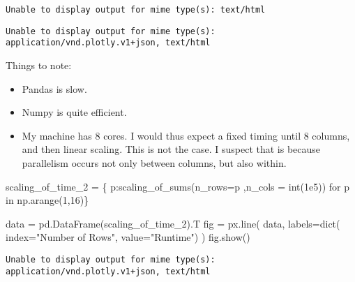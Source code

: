 \documentclass[
  letterpaper,
  DIV=11,
  numbers=noendperiod]{scrartcl}
\newenvironment{Shaded}{\begin{snugshade}}{\end{snugshade}}
\newcommand{\BuiltInTok}[1]{\textcolor[rgb]{0.00,0.23,0.31}{#1}}
\newcommand{\ControlFlowTok}[1]{\textcolor[rgb]{0.00,0.23,0.31}{#1}}
\newcommand{\DecValTok}[1]{\textcolor[rgb]{0.68,0.00,0.00}{#1}}
\newcommand{\FloatTok}[1]{\textcolor[rgb]{0.68,0.00,0.00}{#1}}
\newcommand{\KeywordTok}[1]{\textcolor[rgb]{0.00,0.23,0.31}{#1}}
\newcommand{\NormalTok}[1]{\textcolor[rgb]{0.00,0.23,0.31}{#1}}
\newcommand{\OperatorTok}[1]{\textcolor[rgb]{0.37,0.37,0.37}{#1}}
\newcommand{\StringTok}[1]{\textcolor[rgb]{0.13,0.47,0.30}{#1}}
\providecommand{\tightlist}{%
  \setlength{\itemsep}{0pt}\setlength{\parskip}{0pt}}\usepackage{longtable,booktabs,array}
\begin{document}
\begin{verbatim}
Unable to display output for mime type(s): text/html
\end{verbatim}

\begin{verbatim}
Unable to display output for mime type(s): application/vnd.plotly.v1+json, text/html
\end{verbatim}

Things to note:

\begin{itemize}
\tightlist
\item
  Pandas is slow.
\item
  Numpy is quite efficient.
\item
  My machine has 8 cores. I would thus expect a fixed timing until 8
  columns, and then linear scaling. This is not the case. I suspect that
  is because parallelism occurs not only between columns, but also
  within.
\end{itemize}

\begin{Shaded}
\begin{Highlighting}[]
\NormalTok{scaling\_of\_time\_2 }\OperatorTok{=}\NormalTok{ \{}
\NormalTok{  p:scaling\_of\_sums(n\_rows}\OperatorTok{=}\NormalTok{p ,n\_cols }\OperatorTok{=} \BuiltInTok{int}\NormalTok{(}\FloatTok{1e5}\NormalTok{)) }\ControlFlowTok{for}\NormalTok{ p }\KeywordTok{in}\NormalTok{ np.arange(}\DecValTok{1}\NormalTok{,}\DecValTok{16}\NormalTok{)\}}
\end{Highlighting}
\end{Shaded}

\begin{Shaded}
\begin{Highlighting}[]
\NormalTok{data }\OperatorTok{=}\NormalTok{ pd.DataFrame(scaling\_of\_time\_2).T}
\NormalTok{fig }\OperatorTok{=}\NormalTok{ px.line(}
\NormalTok{  data, }
\NormalTok{  labels}\OperatorTok{=}\BuiltInTok{dict}\NormalTok{(}
\NormalTok{    index}\OperatorTok{=}\StringTok{"Number of Rows"}\NormalTok{, }
\NormalTok{    value}\OperatorTok{=}\StringTok{"Runtime"}\NormalTok{)}
\NormalTok{)}
\NormalTok{fig.show()}
\end{Highlighting}
\end{Shaded}

\begin{verbatim}
Unable to display output for mime type(s): application/vnd.plotly.v1+json, text/html
\end{verbatim}
\end{document}

